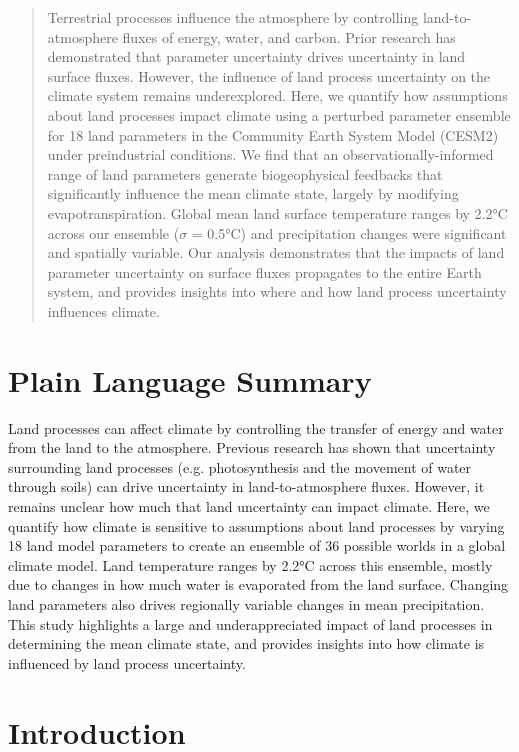 \documentclass[draft]{agujournal2019}
\begin{document}
\begin{abstract}
Terrestrial processes influence the atmosphere by controlling land-to-atmosphere fluxes of energy, water, and carbon. Prior research has demonstrated that parameter uncertainty drives uncertainty in land surface fluxes. However, the influence of land process uncertainty on the climate system remains underexplored. Here, we quantify how assumptions about land processes impact climate using a perturbed parameter ensemble for 18 land parameters in the Community Earth System Model (CESM2) under preindustrial conditions. We find that an observationally-informed range of land parameters generate biogeophysical feedbacks that significantly influence the mean climate state, largely by modifying evapotranspiration. Global mean land surface temperature ranges by 2.2°C across our ensemble ($\sigma$ = 0.5°C) and precipitation changes were significant and spatially variable. Our analysis demonstrates that the impacts of land parameter uncertainty on surface fluxes propagates to the entire Earth system, and provides insights into where and how land process uncertainty influences climate.
\end{abstract}

\section*{Plain Language Summary}
Land processes can affect climate by controlling the transfer of energy and water from the land to the atmosphere. Previous research has shown that uncertainty surrounding land processes (e.g. photosynthesis and the movement of water through soils) can drive uncertainty in land-to-atmosphere fluxes. However, it remains unclear how much that land uncertainty can impact climate. Here, we quantify how climate is sensitive to assumptions about land processes by varying 18 land model parameters to create an ensemble of 36 possible worlds in a global climate model. Land temperature ranges by 2.2°C across this ensemble, mostly due to changes in how much water is evaporated from the land surface. Changing land parameters also drives regionally variable changes in mean precipitation. This study highlights a large and underappreciated impact of land processes in determining the mean climate state, and provides insights into how climate is influenced by land process uncertainty.


\section{Introduction}
\end{document}
